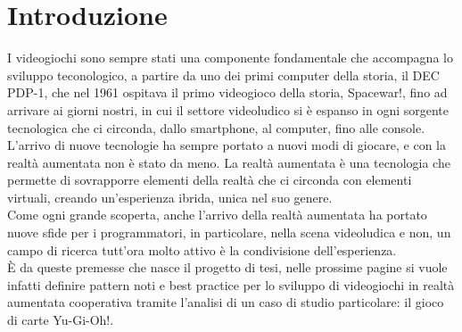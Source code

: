 \chapter{Introduzione} \label{chap:Introduzione}
I videogiochi sono sempre stati una componente fondamentale che accompagna lo 
sviluppo teconologico, a partire da uno dei primi computer della storia, il DEC PDP-1,
che nel 1961 ospitava il primo videogioco della storia, Spacewar!, fino ad arrivare
ai giorni nostri, in cui il settore videoludico si è espanso in ogni sorgente tecnologica
che ci circonda, dallo smartphone, al computer, fino alle console.\\
L'arrivo di nuove tecnologie ha sempre portato a nuovi modi di giocare, e con la 
realtà aumentata non è stato da meno. La realtà aumentata è una tecnologia che permette di sovrapporre elementi della
realtà che ci circonda con elementi virtuali, creando un'esperienza ibrida, unica
nel suo genere.\\
Come ogni grande scoperta, anche l'arrivo della realtà aumentata ha portato nuove
sfide per i programmatori, in particolare, nella scena videoludica e non, un campo 
di ricerca tutt'ora molto attivo è la condivisione dell'esperienza.\\
È da queste premesse che nasce il progetto di tesi, nelle prossime
pagine si vuole infatti definire pattern noti e best practice per lo sviluppo di 
videogiochi in realtà aumentata cooperativa tramite l'analisi di un caso di studio
particolare: il gioco di carte Yu-Gi-Oh!.\\
\\
